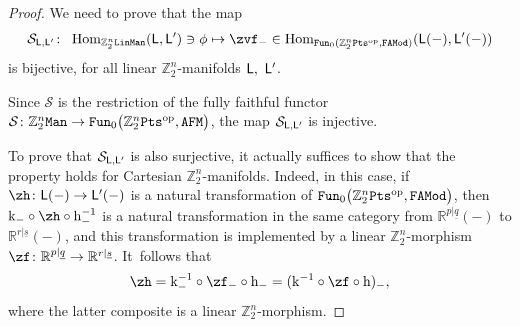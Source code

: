 \documentclass[pdftex]{sigma}%
\newcommand{\op}[1]{\operatorname{#1}}
\newcommand{\R}{{\mathbb R}}
\newcommand{\Z}{{\mathbb Z}}
\def\ul{\underline}
\def\ul{\underline}
\newcommand{\0}{\otimes}
\newcommand{\z}{\Z_2^n}
\numberwithin{equation}{section}
\begin{document}
\begin{proof} We need to prove that the map
\[
\mathcal{S}_{\sf L,L'}\colon\ \op{Hom}_{\z\tt LinMan}({\sf L,L'})\ni\phi\mapsto \zvf_-\in\op{Hom}_{{\tt Fun}_0(\z{\tt Pts}^{\op{op}},\tt FAMod)}({\sf L}(-),{\sf L'}(-))
\]
is bijective, for all linear $\z$-manifolds $\sf L,\ L'$.

Since $\mathcal{S}$ is the restriction of the fully faithful functor $\mathcal{S}\colon {\z\tt Man}\to{\tt Fun}_0\big(\z{\tt Pts}^{\op{op}},{\tt AFM}\big)$, the map $\mathcal{S}_{\sf L,L'}$ is injective.

To prove that $\mathcal{S}_{\sf L,L'}$ is also surjective, it actually suffices to show that the property holds for Cartesian $\z$-manifolds. Indeed, in this case, if $\zh\colon {\sf L}(-)\to{\sf L}'(-)$ is a natural transformation of ${\tt Fun}_0\big(\z{\tt Pts}^{\op{op}},\tt FAMod\big)$, then $ {\rm k}_-\circ \zh\circ{\rm h}^{-1}_-$ is a natural transformation in the same category from $\R^{p|\ul q}(-)$ to $\R^{r|\ul s}(-)$, and this transformation is implemented by a linear $\z$-morphism $\zf\colon \R^{p|\ul q}\to \R^{r|\ul s}$. It~follows that
\[
\zh={\rm k}_-^{-1}\circ\zf_-\circ{\rm h}_-=({\rm k}^{-1}\circ\zf\circ{\rm h})_-,
\]
where the latter composite is a linear $\z$-morphism.


\end{proof}
\end{document}
